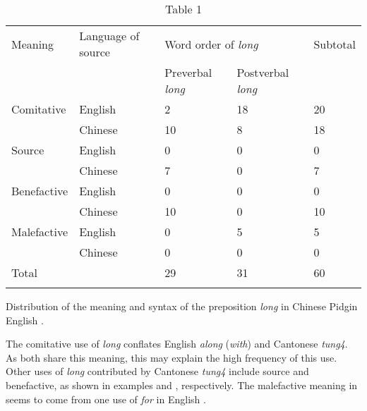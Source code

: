 \documentclass[output=paper]{langsci/langscibook}
\begin{document}
\begin{table}[]
    \centering
   
\begin{tabularx}{\textwidth}{XXXXX}

\lsptoprule
Meaning & 
Language of source &
\multicolumn{2}{X}{ Word order of \textit{long}} & Subtotal\\
&  & Preverbal \textit{long} & Postverbal \textit{long} & \\
Comitative & 
English & 
2 & 
18 & 
20\\
& Chinese & 10 & 8 & 18\\
Source & English & 0 & 0 & 0\\
& Chinese & 7 & 0 & 7\\
Benefactive & English & 0 & 0 & 0\\
& Chinese & 10 & 0 & 10\\
Malefactive & English & 0 & 5 & 5\\
& Chinese & 0 & 0 & 0\\
\hline
Total &  & 29 & 31 & 60\\
\lspbottomrule
\caption{Table 1}
\label{tab:key:1}
\end{tabularx}


  Distribution of the meaning and syntax of the preposition \textit{long} in Chinese Pidgin English \citep{li_origins_2011}.
\end{table}

The comitative use of \textit{long} conflates English \textit{along} (\textit{with}) and Cantonese \textit{tung4}. As both share this meaning, this may explain the high frequency of this use. Other uses of \textit{long} contributed by Cantonese \textit{tung4} include source and benefactive, as shown in examples  and , respectively. The malefactive meaning in  seems to come from one use of \textit{for} in English \citep{li_origins_2011}. 
\end{document}
